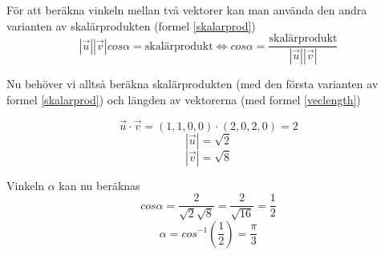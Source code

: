 \documentclass[../../main.tex]{subfiles}
\begin{document}
\begin{solution}{16}

För att beräkna vinkeln mellan två vektorer kan man använda den andra varianten av skalärprodukten (formel \ref{skalarprod})
\[|\Vec{u}||\Vec{v}|cos\alpha = \text{skalärprodukt} \iff cos\alpha = \frac{\text{skalärprodukt}}{|\Vec{u}||\Vec{v}|}\]

Nu behöver vi alltså beräkna skalärprodukten (med den första varianten av formel \ref{skalarprod}) och längden av vektorerna (med formel \ref{veclength})

\[\Vec{u} \cdot \Vec{v} = (1, 1, 0, 0) \cdot (2, 0, 2, 0) = 2\]
\[|\Vec{u}| = \sqrt{2}\]
\[|\Vec{v}| = \sqrt{8}\]

Vinkeln $\alpha$ kan nu beräknas
\[cos\alpha = \frac{2}{\sqrt{2}\sqrt{8}} = \frac{2}{\sqrt{16}} = \frac{1}{2}\]
\[\alpha = cos^{-1}(\frac{1}{2}) = \frac{\pi}{3}\]


\end{solution}
\end{document}
